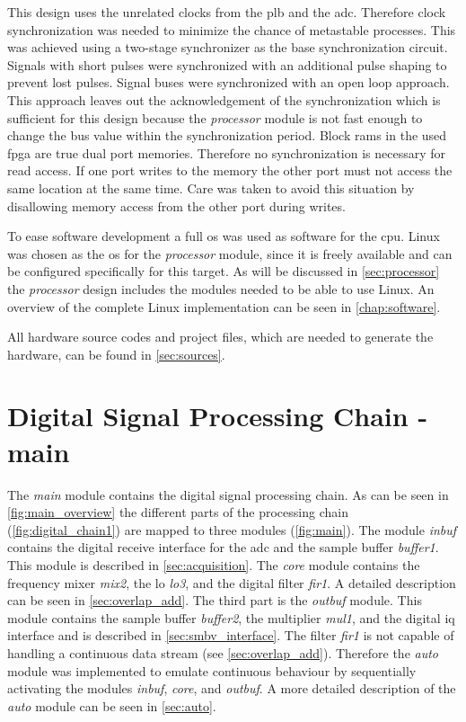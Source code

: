 \documentclass[12pt,a4paper,parskip=full,abstract=true,BCOR=12mm,twoside,open=right]{scrreprt}
\def\device#1{\textit{#1}}
\begin{document}
This design uses the unrelated clocks from the \gls{plb} and the \gls{adc}.
Therefore clock synchronization was needed to minimize the chance of metastable
processes. This was achieved using a two-stage synchronizer as the base
synchronization circuit. Signals with short pulses were synchronized with an
additional pulse shaping to prevent lost pulses. Signal buses were synchronized
with an open loop approach. This approach leaves out the acknowledgement of the
synchronization which is sufficient for this design because the
\device{processor} module is not fast enough to change the bus value within the
synchronization period. Block \glspl{ram} in the used \gls{fpga} are true dual port
memories. Therefore no synchronization is necessary for read access. If one port
writes to the memory the other port must not access the same location at the same
time\cite{virtex5}. Care was taken to avoid this situation by disallowing
memory access from the other port during writes.

To ease software development a full \gls{os} was used as software for the
\gls{cpu}. Linux was chosen as the \gls{os} for the \device{processor} module, since
it is freely available and can be configured specifically for this target. As will
be discussed in \cref{sec:processor} the \device{processor} design includes the modules
needed to be able to use Linux. An overview of the complete Linux implementation
can be seen in \cref{chap:software}.

All hardware source codes and project files, which are needed to generate the hardware, can
be found in \cref{sec:sources}.


\section[Digital Signal Processing Chain]{Digital Signal Processing Chain - main}
\label{sec:digital_processing}

The \device{main} module contains the digital signal processing chain. As can be seen
in \cref{fig:main_overview} the different parts of the processing chain (\cref{fig:digital_chain1}) are mapped
to three modules (\cref{fig:main}). The module \device{inbuf} contains the digital receive interface
for the \gls{adc} and the sample buffer \device{buffer1}. This module is described
in \cref{sec:acquisition}. The \device{core} module contains the frequency
mixer \device{mix2}, the \gls{lo} \device{lo3}, and the digital filter \device{fir1}.
A detailed description can be seen in \cref{sec:overlap_add}. The third part
is the \device{outbuf} module. This module contains the sample buffer \device{buffer2},
the multiplier \device{mul1}, and the digital \gls{iq} interface and is described in \cref{sec:smbv_interface}. The
filter \device{fir1} is not capable of handling a continuous data stream (see
\cref{sec:overlap_add}). Therefore the \device{auto} module was implemented to emulate
continuous behaviour by sequentially activating the modules \device{inbuf}, \device{core},
and \device{outbuf}. A more detailed description of the \device{auto} module can be seen
in \cref{sec:auto}.
\end{document}
